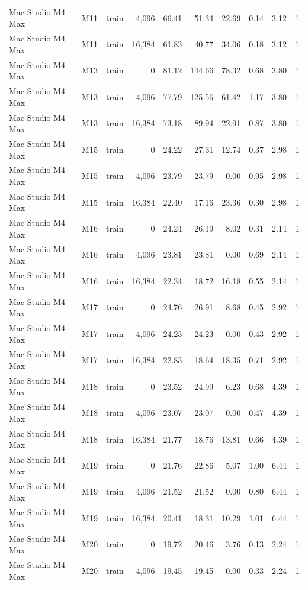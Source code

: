 \documentclass[10pt]{article}
\begin{document}
\begin{landscape}
\begin{longtable}{@{}l l l r r r r r r r@{}}
Mac Studio M4 Max & M11 & train & 4,096 & 66.41 & 51.34 & 22.69 & 0.14 & 3.12 & 1 \\
Mac Studio M4 Max & M11 & train & 16,384 & 61.83 & 40.77 & 34.06 & 0.18 & 3.12 & 1 \\
Mac Studio M4 Max & M13 & train & 0 & 81.12 & 144.66 & 78.32 & 0.68 & 3.80 & 1 \\
Mac Studio M4 Max & M13 & train & 4,096 & 77.79 & 125.56 & 61.42 & 1.17 & 3.80 & 1 \\
Mac Studio M4 Max & M13 & train & 16,384 & 73.18 & 89.94 & 22.91 & 0.87 & 3.80 & 1 \\
Mac Studio M4 Max & M15 & train & 0 & 24.22 & 27.31 & 12.74 & 0.37 & 2.98 & 1 \\
Mac Studio M4 Max & M15 & train & 4,096 & 23.79 & 23.79 & 0.00 & 0.95 & 2.98 & 1 \\
Mac Studio M4 Max & M15 & train & 16,384 & 22.40 & 17.16 & 23.36 & 0.30 & 2.98 & 1 \\
Mac Studio M4 Max & M16 & train & 0 & 24.24 & 26.19 & 8.02 & 0.31 & 2.14 & 1 \\
Mac Studio M4 Max & M16 & train & 4,096 & 23.81 & 23.81 & 0.00 & 0.69 & 2.14 & 1 \\
Mac Studio M4 Max & M16 & train & 16,384 & 22.34 & 18.72 & 16.18 & 0.55 & 2.14 & 1 \\
Mac Studio M4 Max & M17 & train & 0 & 24.76 & 26.91 & 8.68 & 0.45 & 2.92 & 1 \\
Mac Studio M4 Max & M17 & train & 4,096 & 24.23 & 24.23 & 0.00 & 0.43 & 2.92 & 1 \\
Mac Studio M4 Max & M17 & train & 16,384 & 22.83 & 18.64 & 18.35 & 0.71 & 2.92 & 1 \\
Mac Studio M4 Max & M18 & train & 0 & 23.52 & 24.99 & 6.23 & 0.68 & 4.39 & 1 \\
Mac Studio M4 Max & M18 & train & 4,096 & 23.07 & 23.07 & 0.00 & 0.47 & 4.39 & 1 \\
Mac Studio M4 Max & M18 & train & 16,384 & 21.77 & 18.76 & 13.81 & 0.66 & 4.39 & 1 \\
Mac Studio M4 Max & M19 & train & 0 & 21.76 & 22.86 & 5.07 & 1.00 & 6.44 & 1 \\
Mac Studio M4 Max & M19 & train & 4,096 & 21.52 & 21.52 & 0.00 & 0.80 & 6.44 & 1 \\
Mac Studio M4 Max & M19 & train & 16,384 & 20.41 & 18.31 & 10.29 & 1.01 & 6.44 & 1 \\
Mac Studio M4 Max & M20 & train & 0 & 19.72 & 20.46 & 3.76 & 0.13 & 2.24 & 1 \\
Mac Studio M4 Max & M20 & train & 4,096 & 19.45 & 19.45 & 0.00 & 0.33 & 2.24 & 1 \\

\end{longtable}
\end{landscape}
\end{document}
